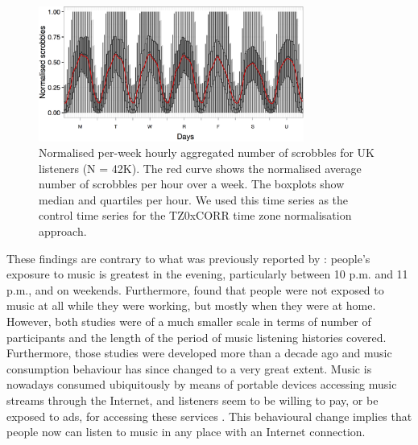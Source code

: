 \begin{figure}[!h]
	\centering
	\includegraphics[width = 0.775\textwidth]{weekly_aggregated_UK_axis.jpg}
	\caption[Normalised per-week hourly aggregated number of scrobbles for UK listeners]{Normalised per-week hourly aggregated number of scrobbles for UK listeners (N = 42K). The red curve shows the normalised average number of scrobbles per hour over a week. The boxplots show median and quartiles per hour. We used this time series as the control time series for the TZ0xCORR time zone normalisation approach.}
	\label{fig:weekly_aggregated_UK_axis}
\end{figure}



These findings are contrary to what was previously reported by \textcite{north04uses}: people's exposure to music is greatest in the evening, particularly between 10 p.m. and 11 p.m., and on weekends. Furthermore, \textcite{sloboda01functions} found that people were not exposed to music at all while they were working, but mostly when they were at home. However, both studies were of a much smaller scale in terms of number of participants and the length of the period of music listening histories covered. 
Furthermore, those studies were developed more than a decade ago and music consumption behaviour has since changed to a very great extent. 
Music is nowadays consumed ubiquitously by means of portable devices accessing music streams through the Internet, and listeners seem to be willing to pay, or be exposed to ads, for accessing these services \autocite{wikstrom13music}. This behavioural change implies that people now can listen to music in any place with an Internet connection.


